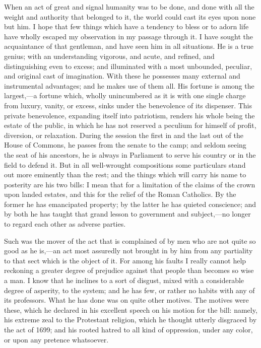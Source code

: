 When an act of great and signal humanity was to be done, and done with all the weight and authority that belonged to it, the world could cast its eyes upon none but him. I hope that few things which have a tendency to bless or to adorn life have wholly escaped my observation in my passage through it. I have sought the acquaintance of that gentleman, and have seen him in all situations. He is a true genius; with an understanding vigorous, and acute, and refined, and distinguishing even to excess; and illuminated with a most unbounded, peculiar, and original cast of imagination. With these he possesses many external and instrumental advantages; and he makes use of them all. His fortune is among the largest,—a fortune which, wholly unincumbered as it is with one single charge from luxury, vanity, or excess, sinks under the benevolence of its dispenser. This private benevolence, expanding itself into patriotism, renders his whole being the estate of the public, in which he has not reserved a peculium for himself of profit, diversion, or relaxation. During the session the first in and the last out of the House of Commons, he passes from the senate to the camp; and seldom seeing the seat of his ancestors, he is always in Parliament to serve his country or in the field to defend it. But in all well-wrought compositions some particulars stand out more eminently than the rest; and the things which will carry his name to posterity are his two bills: I mean that for a limitation of the claims of the crown upon landed estates, and this for the relief of the Roman Catholics. By the former he has emancipated property; by the latter he has quieted conscience; and by both he has taught that grand lesson to government and subject,—no longer to regard each other as adverse parties.

Such was the mover of the act that is complained of by men who are not quite so good as he is,—an act most assuredly not brought in by him from any partiality to that sect which is the object of it. For among his faults I really cannot help reckoning a greater degree of prejudice against that people than becomes so wise a man. I know that he inclines to a sort of disgust, mixed with a considerable degree of asperity, to the system; and he has few, or rather no habits with any of its professors. What he has done was on quite other motives. The motives were these, which he declared in his excellent speech on his motion for the bill: namely, his extreme zeal to the Protestant religion, which he thought utterly disgraced by the act of 1699; and his rooted hatred to all kind of oppression, under any color, or upon any pretence whatsoever.

